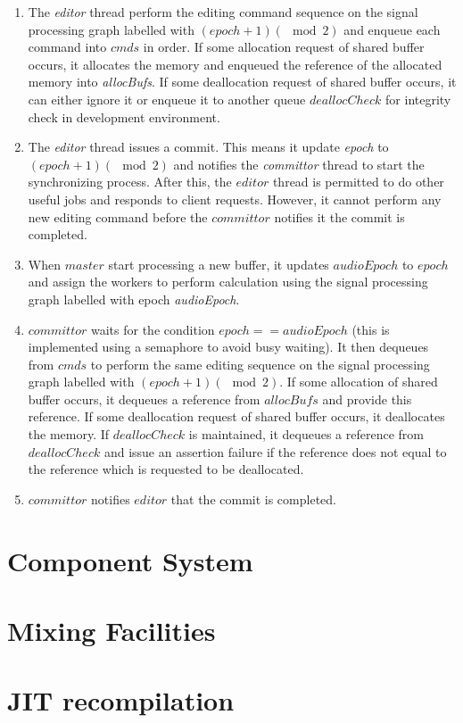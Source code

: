 \documentclass{report}
\begin{document}
\begin{enumerate}
\item The \emph{editor} thread perform the editing command sequence on the signal processing graph labelled with $(epoch+1)(\mod 2)$ and enqueue each command into $cmds$ in order. If some allocation request of shared buffer occurs, it allocates the memory and enqueued the reference of the allocated memory into \emph{allocBufs}. If some deallocation request of shared buffer occurs, it can either ignore it or enqueue it to another queue $deallocCheck$ for integrity check in development environment.
\item The \emph{editor} thread issues a commit. This means it update \emph{epoch} to $(epoch+1)(\mod 2)$ and notifies the \emph{committor} thread to start the synchronizing process. After this, the $editor$ thread is permitted to do other useful jobs and responds to client requests. However, it cannot perform any new editing command before the $committor$ notifies it the commit is completed.
\item When $master$ start processing a new buffer, it updates $audioEpoch$ to $epoch$ and assign the workers to perform calculation using the signal processing graph labelled with epoch \emph{audioEpoch}.
\item $committor$ waits for the condition $epoch == audioEpoch$ (this is implemented using a semaphore to avoid busy waiting). It then dequeues from $cmds$ to perform the same editing sequence on the signal processing graph labelled with $(epoch+1)(\mod 2)$. If some allocation of shared buffer occurs, it dequeues a reference from $allocBufs$ and provide this reference. If some deallocation request of shared buffer occurs, it deallocates the memory. If $deallocCheck$ is maintained, it dequeues a reference from $deallocCheck$ and issue an assertion failure if the reference does not equal to the reference which is requested to be deallocated.
\item $committor$ notifies $editor$ that the commit is completed.
\end{enumerate}
\section{Component System}
\section{Mixing Facilities}
\section{JIT recompilation}
\end{document}
